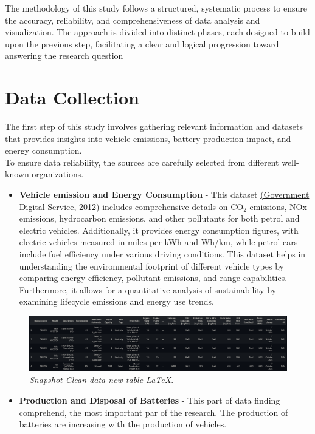 The methodology of this study follows a structured, systematic process to ensure the accuracy, reliability, and comprehensiveness of data analysis and visualization. The approach is divided into distinct phases, each designed to build upon the previous step, facilitating a clear and logical progression toward answering the research question
\clearpage

\section{Data Collection}
 The first step of this study involves gathering relevant information and datasets that provides insights into vehicle emissions, battery production impact, and energy consumption. \\ 
 To ensure data reliability, the sources are carefully selected from different well-known organizations. 
 \begin{itemize}
     \item \textbf{Vehicle emission and Energy Consumption} - This dataset \href{https://www.gov.uk/co2-and-vehicle-tax-tools}{(Government Digital Service, 2012)} includes comprehensive details on CO$_2$ emissions, NOx emissions, hydrocarbon emissions, and other pollutants for both petrol and electric vehicles. Additionally, it provides energy consumption figures, with electric vehicles measured in miles per kWh and Wh/km, while petrol cars include fuel efficiency under various driving conditions. This dataset helps in understanding the environmental footprint of different vehicle types by comparing energy efficiency, pollutant emissions, and range capabilities. Furthermore, it allows for a quantitative analysis of sustainability by examining lifecycle emissions and energy use trends.
 \end{itemize}

 \begin{figure}[H]
    \centering
    \includegraphics[scale=0.38]{figures/Vehicle Emissions.png}
    \caption{\textit{Snapshot Clean data new table \LaTeX}.}
    \label{fig:chart_1}
\end{figure}
\begin{itemize}
    \item \textbf{Production and Disposal of Batteries} - This part of data finding comprehend, the most important par of the research. The production of batteries are increasing with the production of vehicles. 
    
    
\end{itemize}

